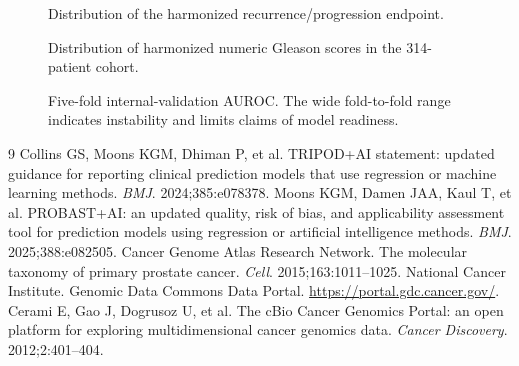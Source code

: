 \documentclass[11pt]{article}
\begin{document}
\begin{figure}[H]
\centering
{}
\caption{Distribution of the harmonized recurrence/progression endpoint.}
\end{figure}

\begin{figure}[H]
\centering
{}
\caption{Distribution of harmonized numeric Gleason scores in the 314-patient cohort.}
\end{figure}

\begin{figure}[H]
\centering
{}
\caption{Five-fold internal-validation AUROC. The wide fold-to-fold range indicates instability and limits claims of model readiness.}
\end{figure}

\begin{thebibliography}{9}
 Collins GS, Moons KGM, Dhiman P, et al. TRIPOD+AI statement: updated guidance for reporting clinical prediction models that use regression or machine learning methods. \textit{BMJ}. 2024;385:e078378.
 Moons KGM, Damen JAA, Kaul T, et al. PROBAST+AI: an updated quality, risk of bias, and applicability assessment tool for prediction models using regression or artificial intelligence methods. \textit{BMJ}. 2025;388:e082505.
 Cancer Genome Atlas Research Network. The molecular taxonomy of primary prostate cancer. \textit{Cell}. 2015;163:1011--1025.
 National Cancer Institute. Genomic Data Commons Data Portal. \url{https://portal.gdc.cancer.gov/}.
 Cerami E, Gao J, Dogrusoz U, et al. The cBio Cancer Genomics Portal: an open platform for exploring multidimensional cancer genomics data. \textit{Cancer Discovery}. 2012;2:401--404.
\end{thebibliography}
\end{document}
